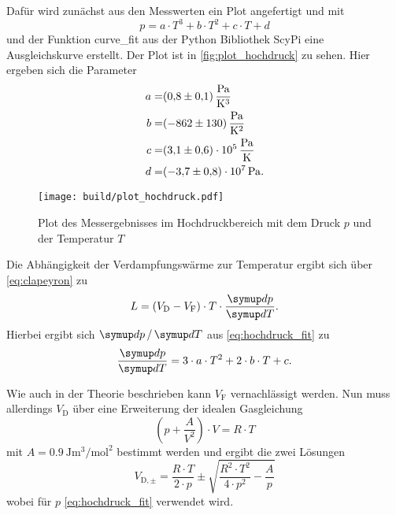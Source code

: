 Dafür wird zunächst aus den Messwerten ein Plot angefertigt und mit
\begin{equation}
    p = a \cdot T^3 + b \cdot T^2 + c \cdot T + d
    \label{eq:hochdruck_fit}
\end{equation}
und der Funktion curve\_fit aus der Python Bibliothek ScyPi eine Ausgleichskurve erstellt.\cite{scipy}
Der Plot ist in \autoref{fig:plot_hochdruck} zu sehen.
Hier ergeben sich die Parameter
\begin{align*}
    a =& \SI{0.8+-0.1}{\pascal\per\kelvin\cubed} \\
    b =& \SI{-862+-130}{\pascal\per\kelvin\squared} \\
    c =& \SI{3.1+-0.6e5}{\pascal\per\kelvin} \\
    d =& \SI{-3.7+-0.8e7}{\pascal}.
\end{align*}

\begin{figure}
    \centering
    \texttt{[image: build/plot\_hochdruck.pdf]}
    \caption{Plot des Messergebnisses im Hochdruckbereich mit dem Druck $p$ und der Temperatur $T$}
    \label{fig:plot_hochdruck}
\end{figure}

Die Abhängigkeit der Verdampfungswärme zur Temperatur ergibt sich über \autoref{eq:clapeyron} zu
\begin{equation}
    L = (V_\text{D}-V_\text{F}) \cdot T \cdot \frac{\dif{p}}{\dif{T}}.
    \label{eq:hochdruck_ergebnis}
\end{equation}
Hierbei ergibt sich $\dif{p}/\dif{T}$ aus \autoref{eq:hochdruck_fit} zu
\begin{equation}
    \frac{\dif{p}}{\dif{T}} = 3 \cdot a \cdot T^2 + 2 \cdot b \cdot T + c.
    \label{eq:ableitung}
\end{equation}

Wie auch in der Theorie beschrieben kann $V_\text{F}$ vernachlässigt werden. 
Nun muss allerdings $V_\text{D}$ über eine Erweiterung der idealen Gasgleichung
\begin{equation}
    \left( p + \frac{A}{V^2} \right) \cdot V = R \cdot T
\end{equation}
mit $A = \SI{0.9}{\joule\meter\cubed\per\mol\squared}$ bestimmt werden und ergibt die zwei Lösungen
\begin{equation}
    V_{\text{D},\pm} = \frac{R \cdot T}{2 \cdot p} \pm \sqrt{\frac{R^2 \cdot T^2}{4 \cdot p^2} - \frac{A}{p}}
\end{equation}
wobei für $p$ \autoref{eq:hochdruck_fit} verwendet wird.


